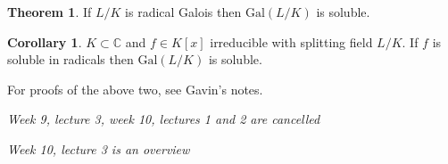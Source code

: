 \documentclass[a4paper]{article}
\newcommand{\C}{\mathbb C}
\newcommand{\gal}{\text{Gal}}
\theoremstyle{definition}
\newtheorem{thm}[defn]{Theorem}
\newtheorem{coro}[defn]{Corollary}
\begin{document}
\begin{thm}
If $L/K$ is radical Galois then $\gal(L/K)$ is soluble.
\end{thm}
\begin{coro}
$K\subset \C$ and $f\in K[x]$ irreducible with splitting field $L/K$. If $f$ is soluble in radicals then $\gal(L/K)$ is soluble.
\end{coro}

For proofs of the above two, see Gavin's notes.

\begin{flushright}
\textit{Week 9, lecture 3, week 10, lectures 1 and 2 are cancelled}
\end{flushright}

\begin{flushright}
\textit{Week 10, lecture 3 is an overview}
\end{flushright}
\end{document}
